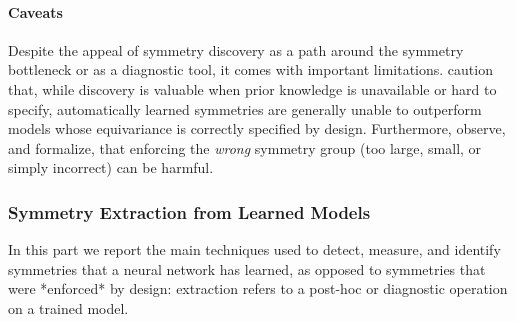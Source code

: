 \documentclass[mathematics,review,submit,moreauthors]{Definitions/mdpi}
\begin{document}
\paragraph{Caveats}
Despite the appeal of symmetry discovery as a path around the symmetry bottleneck or as a diagnostic tool, it comes with important limitations.
\citet{rath2024air} caution that, while discovery is valuable when prior knowledge is unavailable or hard to specify, automatically learned symmetries are generally unable to outperform models whose equivariance is correctly specified by design.
Furthermore, \citet{yang2023p4icml} observe, and \citet{finzi2021anips} formalize, that enforcing the \emph{wrong} symmetry group (too large, small, or simply incorrect) can be harmful.


\subsubsection{Symmetry Extraction from Learned Models}

In this part we report the main techniques used to detect, measure, and identify symmetries that a neural network has learned, as opposed to symmetries that were *enforced* by design: extraction refers to a post-hoc or diagnostic operation on a trained model.
\end{document}
